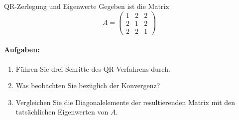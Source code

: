 \begin{example2}{QR-Zerlegung und Eigenwerte}
Gegeben ist die Matrix
$$A = \begin{pmatrix}
1 & 2 & 2\\
2 & 1 & 2\\
2 & 2 & 1
\end{pmatrix}$$

\paragraph{Aufgaben:}
\begin{enumerate}
    \item Führen Sie drei Schritte des QR-Verfahrens durch.
    
    \item Was beobachten Sie bezüglich der Konvergenz? 
    
    \item Vergleichen Sie die Diagonalelemente der resultierenden Matrix mit den tatsächlichen Eigenwerten von $A$.
\end{enumerate}
\end{example2}

